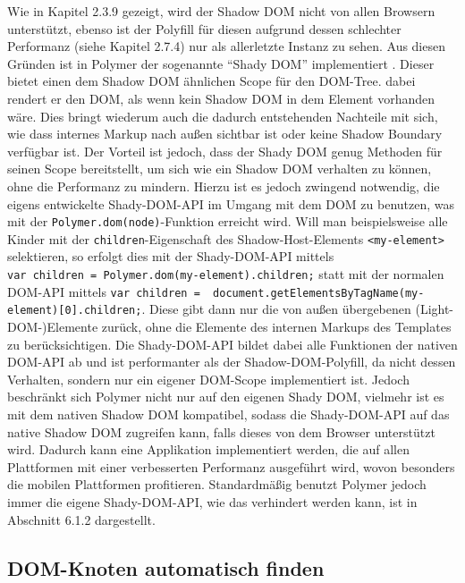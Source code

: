 Wie in Kapitel 2.3.9 gezeigt, wird der Shadow DOM nicht von allen Browsern unterstützt, ebenso ist der Polyfill für diesen aufgrund dessen schlechter Performanz (siehe Kapitel 2.7.4) nur als allerletzte Instanz zu sehen. Aus diesen Gründen ist in Polymer der sogenannte ``Shady DOM'' implementiert \cite{citeulike:13886251}. Dieser bietet einen dem Shadow DOM ähnlichen Scope für den DOM-Tree. dabei rendert er den DOM, als wenn kein Shadow DOM in dem Element vorhanden wäre. Dies bringt wiederum auch die dadurch entstehenden Nachteile mit sich, wie dass internes Markup nach außen sichtbar ist oder keine Shadow Boundary verfügbar ist. Der Vorteil ist jedoch, dass der Shady DOM genug Methoden für seinen Scope bereitstellt, um sich wie ein Shadow DOM verhalten zu können, ohne die Performanz zu mindern. Hierzu ist es jedoch zwingend notwendig, die eigens entwickelte Shady-DOM-API im Umgang mit dem DOM zu benutzen, was mit der \texttt{Polymer.dom(node)}-Funktion erreicht wird. Will man beispielsweise alle Kinder mit der \texttt{children}-Eigenschaft des Shadow-Host-Elements \texttt{\textless{}my-element\textgreater{}} selektieren, so erfolgt dies mit der Shady-DOM-API mittels \texttt{var\ children\ =\ Polymer.dom(my-element).children;} statt mit der normalen DOM-API mittels \texttt{var\ children\ =\ \ document.getElementsByTagName(\dq my-element\dq){[}0{]}.children;}. Diese gibt dann nur die von außen übergebenen (Light-DOM-)Elemente zurück, ohne die Elemente des internen Markups des Templates zu berücksichtigen. Die Shady-DOM-API bildet dabei alle Funktionen der nativen DOM-API ab und ist performanter als der Shadow-DOM-Polyfill, da nicht dessen Verhalten, sondern nur ein eigener DOM-Scope implementiert ist. Jedoch beschränkt sich Polymer nicht nur auf den eigenen Shady DOM, vielmehr ist es mit dem nativen Shadow DOM kompatibel, sodass die Shady-DOM-API auf das native Shadow DOM zugreifen kann, falls dieses von dem Browser unterstützt wird. Dadurch kann eine Applikation implementiert werden, die auf allen Plattformen mit einer verbesserten Performanz ausgeführt wird, wovon besonders die mobilen Plattformen profitieren. Standardmäßig benutzt Polymer jedoch immer die eigene Shady-DOM-API, wie das verhindert werden kann, ist in Abschnitt 6.1.2 dargestellt.


\subsection{DOM-Knoten automatisch finden}\label{dom-knoten-automatisch-finden}

